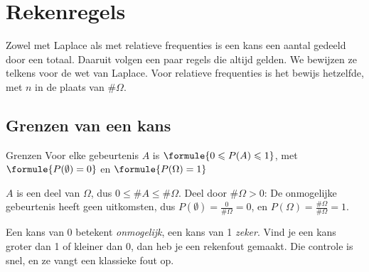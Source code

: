 \begin{oefeningen}
\end{oefeningen}

\section{Rekenregels}

Zowel met Laplace als met relatieve frequenties is een kans een aantal gedeeld door een totaal. Daaruit volgen een paar regels die altijd gelden. We bewijzen ze telkens voor de wet van Laplace. Voor relatieve frequenties is het bewijs hetzelfde, met $n$ in de plaats van $\#\Omega$.

\subsection{Grenzen van een kans}

\begin{theorie}
\begin{stelling}{Grenzen}
Voor elke gebeurtenis $A$ is \quad $\formule{0 \leqslant P(A) \leqslant 1}$, \quad met \quad $\formule{P(\emptyset) = 0}$ \quad en \quad $\formule{P(\Omega) = 1}$
\end{stelling}

\begin{bewijs}
$A$ is een deel van $\Omega$, dus $0 \leqslant \#A \leqslant \#\Omega$. Deel door $\#\Omega > 0$:
De onmogelijke gebeurtenis heeft geen uitkomsten, dus $P(\emptyset) = \frac{0}{\#\Omega} = 0$, en $P(\Omega) = \frac{\#\Omega}{\#\Omega} = 1$.
\end{bewijs}
\end{theorie}

Een kans van 0 betekent \textit{onmogelijk}, een kans van 1 \textit{zeker}. Vind je een kans groter dan 1 of kleiner dan 0, dan heb je een rekenfout gemaakt. Die controle is snel, en ze vangt een klassieke fout op.



